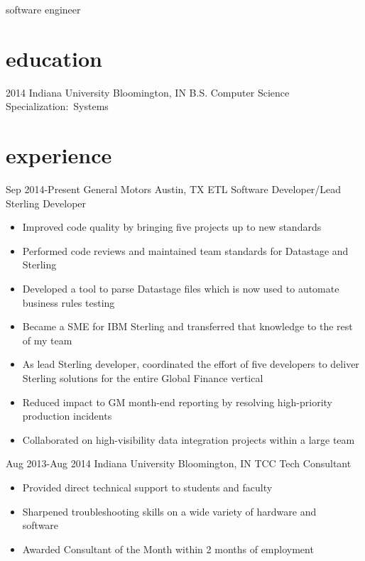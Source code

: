 \documentclass[]{friggeri-cv} %
\begin{document}
 
 
        {software engineer}





\section{education}

 \begin{entrylist}
  \entry
     {2014}
     {Indiana University}
     {Bloomington, IN}
     {B.S. Computer Science}
     {Specialization:~Systems}
    
 \end{entrylist}

 \section{experience}

 \begin{entrylist}
   \entry
     {Sep 2014-Present}
     {General Motors}
     {Austin, TX}
     {ETL Software Developer/Lead Sterling Developer}
     {\begin{itemize}
         \item Improved code quality by bringing five projects up to new standards 
         \item Performed code reviews and maintained team standards for Datastage and Sterling
         \item Developed a tool to parse Datastage files which is now used to automate business rules testing
         \item Became a SME for IBM Sterling and transferred that knowledge to the rest of my team
         \item As lead Sterling developer, coordinated the effort of five developers to deliver Sterling solutions for the entire Global Finance vertical
         \item Reduced impact to GM month-end reporting by resolving high-priority production incidents
         \item Collaborated on high-visibility data integration projects within a large team


     \end{itemize}}
   \entry
     {Aug 2013-Aug 2014}
     {Indiana University}
     {Bloomington, IN}
     {TCC Tech Consultant}
     {\begin{itemize}
        \item Provided direct technical support to students and faculty
        \item Sharpened troubleshooting skills on a wide variety of hardware and \\software
        \item Awarded Consultant of the Month within 2 months of employment
     \end{itemize}
     }
 \end{entrylist}
\end{document}
